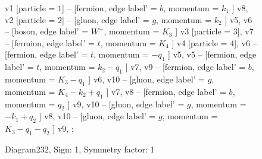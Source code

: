 \documentclass{revtex4}
\begin{document}
\begin{figure}[!htb]
\begin{center}
{v1 [particle = \(1\)] -- [fermion, edge label' = \(b\), momentum = \(k_{1}\) ] v8, 
v2 [particle = \(2\)] -- [gluon, edge label' = \(g\), momentum = \(k_{2}\) ] v5, 
v6 -- [boson, edge label' = \(W^{-}\), momentum = \(K_{3}\) ] v3 [particle = \(3\)], 
v7 -- [fermion, edge label' = \(t\), momentum = \(K_{4}\) ] v4 [particle = \(4\)], 
v6 -- [fermion, edge label' = \(t\), momentum = \(-q_{1}\) ] v5, 
v5 -- [fermion, edge label' = \(t\), momentum = \(k_{2} - q_{1}\) ] v7, 
v9 -- [fermion, edge label' = \(b\), momentum = \(K_{3} - q_{1}\) ] v6, 
v10 -- [gluon, edge label' = \(g\), momentum = \(K_{4} - k_{2} + q_{1}\) ] v7, 
v8 -- [fermion, edge label' = \(b\), momentum = \(q_{2}\) ] v9, 
v10 -- [gluon, edge label' = \(g\), momentum = \(-k_{1} + q_{2}\) ] v8, 
v10 -- [gluon, edge label' = \(g\), momentum = \(K_{3} - q_{1} - q_{2}\) ] v9, 
};
\end{center}
\caption{Diagram232, Sign: 1, Symmetry factor: 1}
\end{figure}
\newpage
\end{document}

